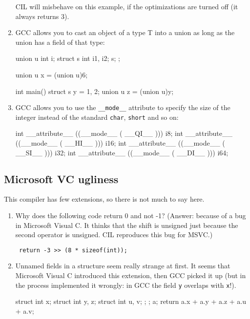 \documentclass{article}
\def\t#1{{\tt #1}}
\begin{document}
\begin{enumerate}
 CIL will misbehave on this example, if the optimizations are turned off (it
 always returns 3).

\item GCC allows you to cast an object of a type T into a union as long as the
union has a field of that type:
\begin{cilcode}[global]
union u { 
   int i; 
   struct s { 
      int i1, i2;
   } s;
};

union u x = (union u)6;

int main() {
  struct s y = {1, 2};
  union u  z = (union u)y;
}
\end{cilcode}

\item GCC allows you to use the \t{\_\_mode\_\_} attribute to specify the size
of the integer instead of the standard \t{char}, \t{short} and so on:
\begin{cilcode}[global]
int __attribute__ ((__mode__ (  __QI__ ))) i8;
int __attribute__ ((__mode__ (  __HI__ ))) i16;
int __attribute__ ((__mode__ (  __SI__ ))) i32;
int __attribute__ ((__mode__ (  __DI__ ))) i64;
\end{cilcode}

\end{enumerate}

 \subsection{Microsoft VC ugliness}

 This compiler has few extensions, so there is not much to say here.

\begin{enumerate}
\item Why does the following code return 0 and not -1? (Answer: because of a
bug in Microsoft Visual C. It thinks that the shift is unsigned just because
the second operator is unsigned. CIL reproduces this bug for MSVC.)

\begin{verbatim}
 return -3 >> (8 * sizeof(int));
\end{verbatim}

\item Unnamed fields in a structure seem really strange at first. It seems
that Microsoft Visual C introduced this extension, then GCC picked it up (but
in the process implemented it wrongly: in GCC the field \t{y} overlaps with
\t{x}!).

\begin{cilcode}[local]
struct {
  int x;
  struct {
     int y, z;
     struct {
       int u, v;
     };
 };
} a;
return a.x + a.y + a.z + a.u + a.v;
\end{cilcode}


\end{enumerate}
\end{document}
